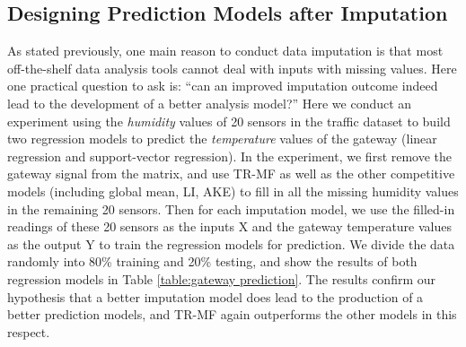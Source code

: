 

\subsection{Designing Prediction Models after Imputation}\label{subsec:furtherPredict}
As stated previously, one main reason to conduct data imputation is that most off-the-shelf data analysis tools cannot deal with inputs with missing values.
Here one practical question to ask is: ``can an improved imputation outcome indeed lead to the development of a better analysis model?''
Here we conduct an experiment using the {\em humidity} values of 20 sensors in the traffic dataset to build two regression models to predict the {\em temperature} values of the gateway (linear regression and support-vector regression).
In the experiment, we first remove the gateway signal from the matrix, and use TR-MF as well as the other competitive models (including global mean, LI, AKE) to fill in all the missing humidity values in the remaining 20 sensors.
Then for each imputation model, we use the filled-in readings of these 20 sensors as the inputs X and the gateway temperature values as the output Y to train the regression models for prediction.
We divide the data randomly into 80\% training and 20\% testing, and show the results of both regression models in Table \ref{table:gateway prediction}.
The results confirm our hypothesis that a better imputation model does lead to the production of a better prediction models, and TR-MF again outperforms the other models in this respect.


